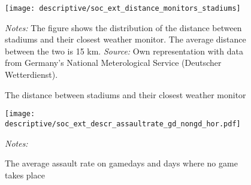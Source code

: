 \documentclass[11pt, a4paper]{article} %
\begin{document}
\vspace*{\fill}
\begin{figure}[H]\centering
	\caption{The distance between stadiums and their closest weather monitor}\label{fig_soc_ext:hist_distance_stadium_monitors}
	\texttt{[image: descriptive/soc\_ext\_distance\_monitors\_stadiums]}
	\begin{minipage}{0.95\linewidth}
		\scriptsize{\emph{Notes:} The figure shows the distribution of the distance between stadiums and their closest weather monitor. The average distance between the two is 15 km. \newline \emph{Source:} Own representation with data from Germany's National Meterological Service (Deutscher Wetterdienst).}
	\end{minipage}
\end{figure}
\vspace*{\fill}\clearpage





\vspace*{\fill}
\begin{figure}[H]\centering
	\caption{The average assault rate on gamedays and days where no game takes place}\label{fig_soc_ext:}
	\texttt{[image: descriptive/soc\_ext\_descr\_assaultrate\_gd\_nongd\_hor.pdf]}
	\begin{minipage}{0.95\linewidth}
		\scriptsize{\emph{Notes:} }
	\end{minipage}
\end{figure}
\vspace*{\fill}\clearpage
\end{document}
